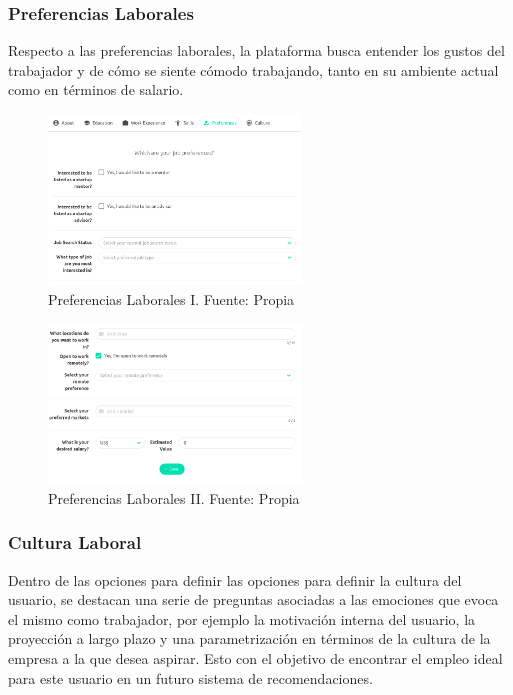 \subsubsection{Preferencias Laborales}

Respecto a las preferencias laborales, la plataforma busca entender los gustos del trabajador y de cómo se siente cómodo trabajando, tanto en su ambiente actual como en términos de salario.

\begin{figure}[H]
\centering
\includegraphics[width=0.60\textwidth]{img/27.png}
\caption{Preferencias Laborales I. Fuente: Propia}
\label{figure:usersWorkSPref1}
\end{figure}

\begin{figure}[H]
\centering
\includegraphics[width=0.60\textwidth]{img/28.png}
\caption{Preferencias Laborales II. Fuente: Propia}
\label{figure:usersWorkSPref2}
\end{figure}

\subsubsection{Cultura Laboral}

Dentro de las opciones para definir las opciones para definir la cultura del usuario, se destacan una serie de preguntas asociadas a las emociones que evoca el mismo como trabajador, por ejemplo la motivación interna del usuario, la proyección a largo plazo y una parametrización en términos de la cultura de la empresa a la que desea aspirar. Esto con el objetivo de encontrar el empleo ideal para este usuario en un futuro sistema de recomendaciones.

